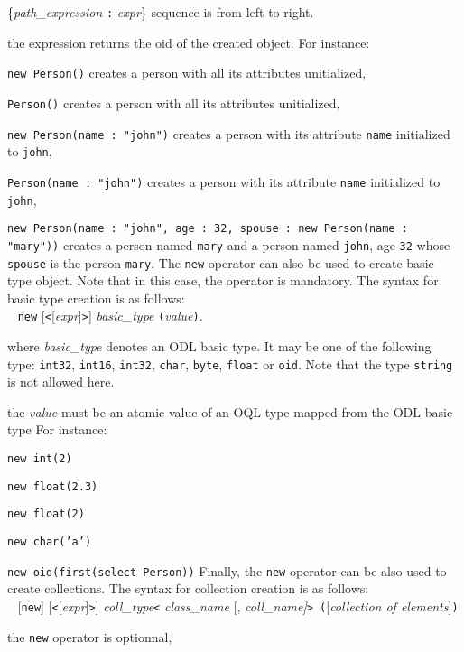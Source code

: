 \{\emph{path\_expression} \texttt{:} \emph{expr}\} sequence is from left
to right.
\item the expression returns the oid of the created object.
\ee
For instance:
\bi
\item \texttt{new Person()} creates a person with all its attributes
unitialized,
\item \texttt{Person()} creates a person with all its attributes
unitialized,
\item \texttt{new Person(name : "john")} creates a person with its
attribute \texttt{name} initialized to \texttt{john},
\item \texttt{Person(name : "john")} creates a person with its
attribute \texttt{name} initialized to \texttt{john},
\item \texttt{new Person(name : "john", age : 32, spouse : new Person(name :
"mary"))} creates a person named \texttt{mary} and a person named
\texttt{john}, age \texttt{32} whose \texttt{spouse} is the person
\texttt{mary}.
\ei
The \texttt{new} operator can also be used to create basic type
object. Note that in this case, the operator is mandatory.
The syntax for basic type creation is as follows:\\
\mbox{ } \texttt{new} [\texttt{<}[\emph{expr}]\texttt{>}] \emph{basic\_type}
\texttt{(}\emph{value}\texttt{)}.
\be
\item where \emph{basic\_type} denotes an ODL basic type.
It may be one of the following type:
\texttt{int32}, \texttt{int16}, \texttt{int32},
\texttt{char}, \texttt{byte}, \texttt{float} or \texttt{oid}. Note
that the type \texttt{string} is not allowed here.
\item the \emph{value} must be an atomic value of an OQL type mapped
from the ODL basic type
\ee
For instance:
\bi
\item \texttt{new int(2)}
\item \texttt{new float(2.3)}
\item \texttt{new float(2)}
\item \texttt{new char('a')}
\item \texttt{new oid(first(select Person))}
\ei
Finally, the \texttt{new} operator can be also used to create collections.
The syntax for collection creation is as follows:\\
\mbox{ } [\texttt{new}] [\texttt{<}[\emph{expr}]\texttt{>}] \emph{coll\_type}\texttt{<}
\emph{class\_name} [, \emph{coll\_name]}\texttt{> (}[\emph{collection of elements}]\texttt{)}
\be
\item the \texttt{new} operator is optionnal,
